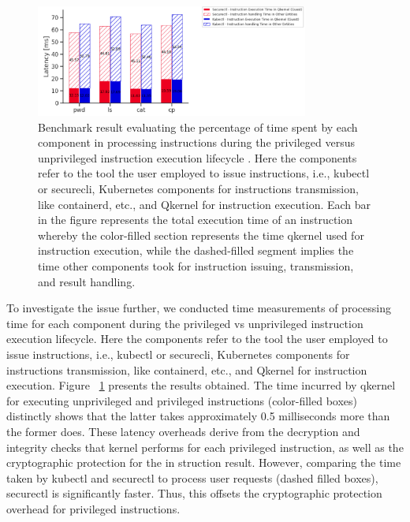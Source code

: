 \begin{figure}[H]
    \centering
    \includegraphics[width=0.8\textwidth]{images/timeshare_issuing_cmd_in_cquark_kubectl_securectl.PNG}
    \caption[Benchmark result - The processing time for components during the privileged vs unprivileged instruction execution lifecycle]{Benchmark result evaluating the percentage of time spent by each component in processing instructions during the privileged versus unprivileged instruction 
    execution lifecycle . Here the components refer to the tool the user employed to issue instructions, i.e., kubectl or securecli,  Kubernetes components for instructions transmission, like containerd, etc., and Qkernel for instruction execution.  Each bar in the 
    figure represents the total execution time of an instruction whereby the color-filled section represents the time qkernel used for instruction execution, while the dashed-filled segment implies the time other components took for instruction issuing, transmission, and result handling.
    }
    \label{fig:timeshare_issuing_cmd_in_cquark_kubectl_securectl}
\end{figure}

To investigate the issue further, we conducted time  measurements of processing time for each component during the privileged vs unprivileged instruction execution lifecycle. Here the components refer to the tool the user employed 
to issue instructions, i.e., kubectl or securecli,  Kubernetes components for instructions transmission, like containerd, etc., and Qkernel for instruction execution.
Figure ~\ref{fig:timeshare_issuing_cmd_in_cquark_kubectl_securectl} presents the results obtained. The time incurred by qkernel for executing unprivileged and privileged instructions (color-filled boxes) distinctly shows that the latter takes approximately 0.5 milliseconds more than the former does. These latency overheads derive from the decryption and 
integrity checks that kernel performs for each privileged instruction, as well as the cryptographic protection for the in
struction result. However, comparing the time taken by kubectl and securectl to process user requests (dashed filled boxes), securectl is significantly faster. Thus, this 
offsets the cryptographic protection overhead for privileged instructions.

